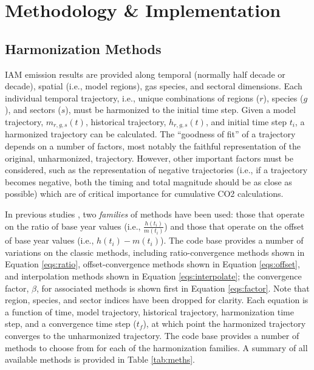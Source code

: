 \section{Methodology \& Implementation}\label{sec:meths}

\subsection{Harmonization Methods}

IAM emission results are provided along temporal (normally half decade or
decade), spatial (i.e., model regions), gas species, and sectoral
dimensions. Each individual temporal trajectory, i.e., unique combinations of
regions ($r$), species ($g$), and sectors ($s$), must be harmonized to the
initial time step. Given a model trajectory, $m_{r, g, s}(t)$, historical
trajectory, $h_{r, g, s}(t)$, and initial time step $t_i$, a harmonized
trajectory can be calculated. The ``goodness of fit'' of a trajectory depends on
a number of factors, most notably the faithful representation of the original,
unharmonized, trajectory. However, other important factors must be considered,
such as the representation of negative trajectories (i.e., if a trajectory
becomes negative, both the timing and total magnitude should be as close as
possible) which are of critical importance for cumulative CO2 calculations.

In previous studies \cite{meinshausen_rcp_2011,rogelj_discrepancies_2011}, two
\textit{families} of methods have been used: those that operate on the ratio of
base year values (i.e., $\frac{h(t_i)}{m(t_i)}$) and those that operate on the
offset of base year values (i.e., $h(t_i) - m(t_i)$). The  code
base provides a number of variations on the classic methods, including
ratio-convergence methods shown in Equation \ref{eqs:ratio}, offset-convergence
methods shown in Equation \ref{eqs:offset}, and interpolation methods shown in
Equation \ref{eqs:interpolate}; the convergence factor, $\beta$, for associated
methods is shown first in Equation \ref{eqs:factor}. Note that region, species,
and sector indices have been dropped for clarity. Each equation is a function of
time, model trajectory, historical trajectory, harmonization time step, and a
convergence time step ($t_f$), at which point the harmonized trajectory
converges to the unharmonized trajectory. The  code base provides a
number of methods to choose from for each of the harmonization families. A
summary of all available methods is provided in Table \ref{tab:meths}.


